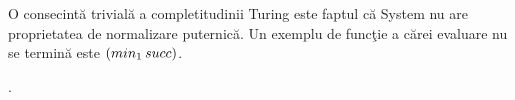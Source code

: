 \begin{remark}
O consecint\u a trivial\u a a completitudinii Turing este faptul c\u a System \frec nu are proprietatea de normalizare puternic\u a. Un exemplu de func\c tie a c\u arei evaluare nu se termin\u a este $(min_1\hspace{2pt} succ)$.
\end{remark}

\done{}.

